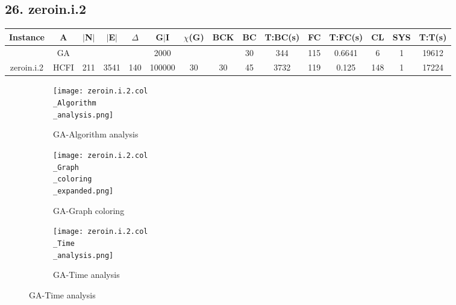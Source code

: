 \documentclass[10pt]{article}
\begin{document}
\subsection*{\hspace{0,9073976cm} 26. zeroin.i.2}
\begin{table}[H]
\centering
\begin{tabular}{|c|c|c|c|c|c|c|c|c|c|c|c|c|c|c|}
\hline
Instance& A &$|$N$|$ & $|$E$|$ & $\Delta$ & G$|$I & $\chi$(G) &BCK&BC & T:BC(s) & FC & T:FC(s) & CL & SYS & T:T(s) \\ \hline \hline

	&GA&       &                   &                     &     2000    &     \cellcolor{yellow} & {\cellcolor{yellow}}& {{\cellcolor{green}30}}
&344   &115        & 0.6641                   &6                    & 1         &19612        \\ \cline{2-2} \cline{6-6} \cline{9-15}
 \multirow{-2}{*}{zeroin.i.2} &HCFI   &\multirow{-2}{*}{211}   &\multirow{-2}{*}{3541}     &\multirow{-2}{*}{140}     &100000     &\multirow{-2}{*}{\cellcolor{yellow}30}      & \multirow{-2}{*}{\cellcolor{yellow}30}    &{\cellcolor{green}45}     &3732         &119    &0.125         &148    &1     &17224        \\ \hline 
\end{tabular}
\end{table}
\graphicspath{{./Core1/Solutions/GA/zeroin.i.2.col}}
\begin{figure}[H]
\begin{subfigure}{.33\textwidth}
  \centering
  \texttt{[image: zeroin.i.2.col\\\_Algorithm\\\_analysis.png]}
  \caption{GA-Algorithm analysis}
   \label{fig:subfig1}
\end{subfigure}%
\begin{subfigure}{.33\textwidth}
  \centering
  \texttt{[image: zeroin.i.2.col\\\_Graph\\\_coloring\\\_expanded.png]}
  \caption{GA-Graph coloring}
  \label{fig:subfig2}
\end{subfigure}
\begin{subfigure}{.33\textwidth}
  \centering
  \texttt{[image: zeroin.i.2.col\\\_Time\\\_analysis.png]}
  \caption{GA-Time analysis}
  \end{subfigure}
\end{figure}
\end{document}
